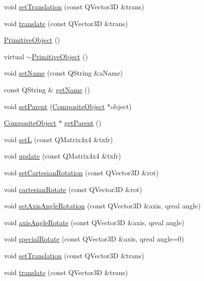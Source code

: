 \begin{DoxyCompactItemize}
\item 
void \hyperlink{class_robot_model_1_1_primitive_object_ae6c417003b52df18a52711031e95c44a}{setTranslation} (const QVector3D \&trans)
\item 
void \hyperlink{class_robot_model_1_1_primitive_object_ae41a1dcacd77b59c44409a77b0183a77}{translate} (const QVector3D \&trans)
\item 
\hyperlink{class_robot_model_1_1_primitive_object_a93382341d2ad150badc6b28300e8047b}{PrimitiveObject} ()
\item 
virtual \hyperlink{class_robot_model_1_1_primitive_object_aaa5d9d16c5eb4122376afc32ad9fd3d8}{$\sim$PrimitiveObject} ()
\item 
void \hyperlink{class_robot_model_1_1_primitive_object_a61c7cffdac933e1f363fa7d4715f669c}{setName} (const QString \&aName)
\item 
const QString \& \hyperlink{class_robot_model_1_1_primitive_object_a2bad14bd18e70f3e95b6ebfca7014d2e}{getName} ()
\item 
void \hyperlink{class_robot_model_1_1_primitive_object_a9097dd663246a16af3da8a4b193e6c14}{setParent} (\hyperlink{class_robot_model_1_1_composite_object}{CompositeObject} $\ast$object)
\item 
\hyperlink{class_robot_model_1_1_composite_object}{CompositeObject} $\ast$ \hyperlink{class_robot_model_1_1_primitive_object_a6981588496b77d1942435296631d1ef0}{getParent} ()
\item 
void \hyperlink{class_robot_model_1_1_primitive_object_a299181992bf3af3dab1a119e03b2944e}{setL} (const QMatrix4x4 \&txfr)
\item 
void \hyperlink{class_robot_model_1_1_primitive_object_ad6d1d0cfd2808ecf051a0d49689dfa86}{update} (const QMatrix4x4 \&txfr)
\item 
void \hyperlink{class_robot_model_1_1_primitive_object_afa2afdbe412aadfe4d7bb951e4d7b8fa}{setCartesianRotation} (const QVector3D \&rot)
\item 
void \hyperlink{class_robot_model_1_1_primitive_object_aa490f6642a6a02d48cf8ed9cd49a47f7}{cartesianRotate} (const QVector3D \&rot)
\item 
void \hyperlink{class_robot_model_1_1_primitive_object_a4a91537e10478b31fb8a025c0faac770}{setAxisAngleRotation} (const QVector3D \&axis, qreal angle)
\item 
void \hyperlink{class_robot_model_1_1_primitive_object_ae57db819937782138821a30960a72aa0}{axisAngleRotate} (const QVector3D \&axis, qreal angle)
\item 
void \hyperlink{class_robot_model_1_1_primitive_object_a33c01b56d7daf2e1d94419f25b9fa902}{specialRotate} (const QVector3D \&axis, qreal angle=0)
\item 
void \hyperlink{class_robot_model_1_1_primitive_object_a58f3d8655dd442ee1032f3582027604a}{setTranslation} (const QVector3D \&trans)
\item 
void \hyperlink{class_robot_model_1_1_primitive_object_aeddf2c45f6a3d60f2566e58728cc2a96}{translate} (const QVector3D \&trans)
\end{DoxyCompactItemize}

